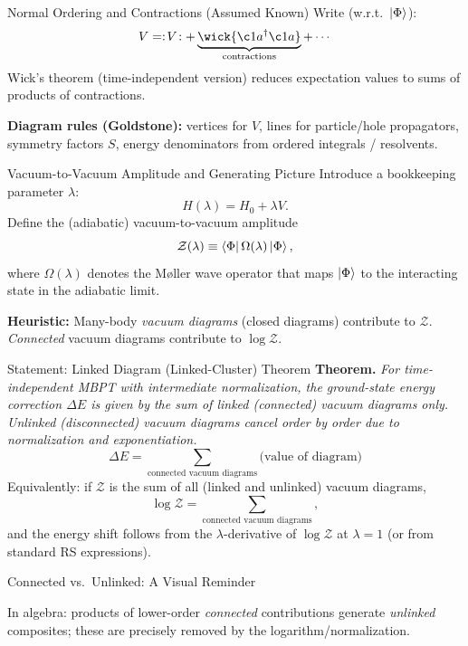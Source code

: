 \documentclass[aspectratio=169,11pt]{beamer}
\newcommand{\NO}[1]{:\!#1\!:}                         %
\newcommand{\Hn}{H_0}
\newcommand{\V}{V}
\newcommand{\ketPhi}{\ket{\Phi}}                      %
\newcommand{\braPhi}{\bra{\Phi}}
\newcommand{\Z}{\mathcal{Z}}
\begin{document}
\begin{frame}{Normal Ordering and Contractions (Assumed Known)}
Write (w.r.t.\ $\ketPhi$):
\[
\V=\NO{\V} + \underbrace{\wick{\c1 a^\dagger \c1 a}}_{\text{contractions}} + \cdots
\]
Wick's theorem (time-independent version) reduces expectation values to sums of products of contractions.\medskip

\textbf{Diagram rules (Goldstone):} vertices for $\V$, lines for particle/hole propagators, symmetry factors $S$, energy denominators from ordered integrals / resolvents.
\end{frame}

\begin{frame}{Vacuum-to-Vacuum Amplitude and Generating Picture}
Introduce a bookkeeping parameter $\lambda$:
\[
H(\lambda)=\Hn+\lambda \V.
\]
Define the (adiabatic) vacuum-to-vacuum amplitude
\[
\Z(\lambda) \equiv \braPhi \Omega(\lambda) \ketPhi,
\]
where $\Omega(\lambda)$ denotes the M\o ller wave operator that maps $\ketPhi$ to the interacting state in the adiabatic limit.
\smallskip

\textbf{Heuristic:} Many-body \emph{vacuum diagrams} (closed diagrams) contribute to $\Z$. \emph{Connected} vacuum diagrams contribute to $\log\Z$.
\end{frame}

\begin{frame}{Statement: Linked Diagram (Linked-Cluster) Theorem}
\textbf{Theorem.} \emph{For time-independent MBPT with intermediate normalization, the ground-state energy correction $\Delta E$ is given by the sum of \emph{linked} (connected) vacuum diagrams only. Unlinked (disconnected) vacuum diagrams cancel order by order due to normalization and exponentiation.}
\[
\boxed{\;\Delta E = \sum_{\text{connected vacuum diagrams}} \text{(value of diagram)}\;}
\]
Equivalently: if $\Z$ is the sum of all (linked and unlinked) vacuum diagrams,
\[
\log \Z = \sum_{\text{connected vacuum diagrams}},
\]
and the energy shift follows from the $\lambda$-derivative of $\log\Z$ at $\lambda=1$ (or from standard RS expressions).
\end{frame}

\begin{frame}{Connected vs.\ Unlinked: A Visual Reminder}
\centering
{}

\smallskip
In algebra: products of lower-order \emph{connected} contributions generate \emph{unlinked} composites; these are precisely removed by the logarithm/normalization.
\end{frame}
\end{document}
